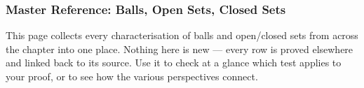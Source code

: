 %
%

\subsubsection{Master Reference: Balls, Open Sets, Closed Sets}
\label{sec:open-closed-master-summary}

\begin{tcolorbox}[colback=gray!6, colframe=gray!40, arc=2pt,
  left=8pt, right=8pt, top=6pt, bottom=6pt,
  title={\small\textbf{How to Use This Page}},
  fonttitle=\small\bfseries]
This page collects every characterisation of balls and open/closed sets
from across the chapter into one place.
Nothing here is new --- every row is proved elsewhere and
linked back to its source.
Use it to check at a glance which test applies to your proof,
or to see how the various perspectives connect.
\end{tcolorbox}

\bigskip

